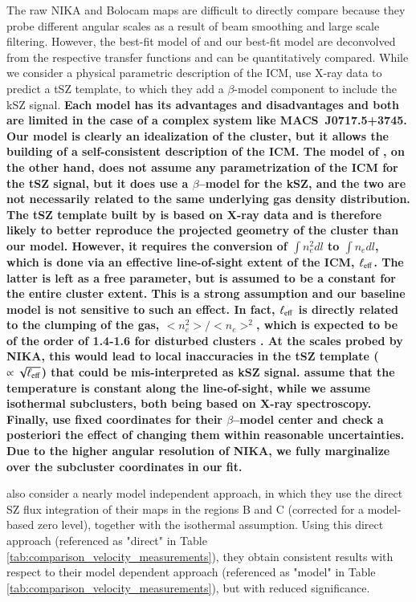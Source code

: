 \documentclass[twocolumn,traditabstract]{aa}
\begin{document}
The raw NIKA and Bolocam maps are difficult to directly compare because they probe different angular scales as a result of beam smoothing and large scale filtering. However, the best-fit model of \cite{Sayers2013} and our best-fit model are deconvolved from the respective transfer functions and can be quantitatively compared. While we consider a physical parametric description of the ICM, \cite{Sayers2013} use X-ray data to predict a tSZ template, to which they add a $\beta$-model component to include the kSZ signal. {\bf Each model has its advantages and disadvantages and both are limited in the case of a complex system like \mbox{MACS~J0717.5+3745}. Our model is clearly an idealization of the cluster, but it allows the building of a self-consistent description of the ICM. The model of \cite{Sayers2013}, on the other hand, does not assume any parametrization of the ICM for the tSZ signal, but it does use a $\beta$--model for the kSZ, and the two are not necessarily related to the same underlying gas density distribution. The tSZ template built by \cite{Sayers2013} is based on X-ray data and is therefore likely to better reproduce the projected geometry of the cluster than our model. However, it requires the conversion of $\int n_e^2 dl$ to $\int n_e dl$, which is done via an effective line-of-sight extent of the ICM, $\ell_{\rm eff}$. The latter is left as a free parameter, but is assumed to be a constant for the entire cluster extent. This is a strong assumption and our baseline model is not sensitive to such an effect. In fact, $\ell_{\rm eff}$ is directly related to the clumping of the gas, $< n_e^2> / <n_e>^2$, which is expected to be of the order of 1.4-1.6 for disturbed clusters \citep[e.g.,][]{Zhuravleva2013}. At the scales probed by NIKA, this would lead to local inaccuracies in the tSZ template ($\propto \sqrt{\ell_{\rm eff}}$) that could be mis-interpreted as kSZ signal. \cite{Sayers2013} assume that the temperature is constant along the line-of-sight, while we assume isothermal subclusters, both being based on X-ray spectroscopy. Finally, \cite{Sayers2013} use fixed coordinates for their $\beta$--model center and check a posteriori the effect of changing them within reasonable uncertainties. Due to the higher angular resolution of NIKA, we fully marginalize over the subcluster coordinates in our fit.}

\cite{Sayers2013} also consider a nearly model independent approach, in which they use the direct SZ flux integration of their maps in the regions B and C (corrected for a model-based zero level), together with the isothermal assumption. Using this direct approach (referenced as "direct" in Table \ref{tab:comparison_velocity_measurements}), they obtain consistent results with respect to their model dependent approach (referenced as "model" in Table \ref{tab:comparison_velocity_measurements}), but with reduced significance.
\end{document}
